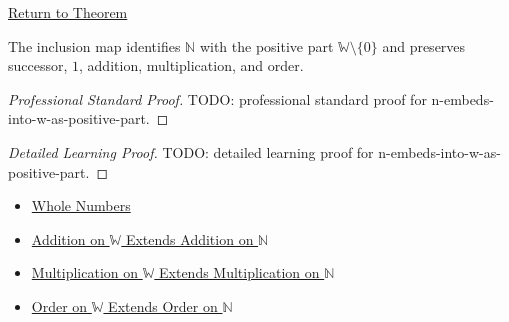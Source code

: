 \newpage
{}
\label{prf:n-embeds-into-w-as-positive-part}

\begin{remark*}[Return]
\hyperref[thm:n-embeds-into-w-as-positive-part]{Return to Theorem}
\end{remark*}

\begin{theorem*}
The inclusion map identifies $\mathbb{N}$ with the positive part
$\mathbb{W}\setminus\{0\}$ and preserves successor, $1$, addition,
multiplication, and order.
\end{theorem*}

\begin{proof}[Professional Standard Proof]
\LRAProofBodyStart
TODO: professional standard proof for n-embeds-into-w-as-positive-part.
\end{proof}

\begin{proof}[Detailed Learning Proof]
\LRAProofBodyStart
TODO: detailed learning proof for n-embeds-into-w-as-positive-part.
\end{proof}

\begin{remark*}
\end{remark*}

\begin{dependencies}
\begin{itemize}
  \item \hyperref[def:whole-numbers]{Whole Numbers}
  \item \hyperref[thm:addition-on-w-extends-addition-on-n]{Addition on $\mathbb{W}$ Extends Addition on $\mathbb{N}$}
  \item \hyperref[thm:multiplication-on-w-extends-multiplication-on-n]{Multiplication on $\mathbb{W}$ Extends Multiplication on $\mathbb{N}$}
  \item \hyperref[thm:order-on-w-extends-order-on-n]{Order on $\mathbb{W}$ Extends Order on $\mathbb{N}$}
\end{itemize}
\end{dependencies}

\clearpage
